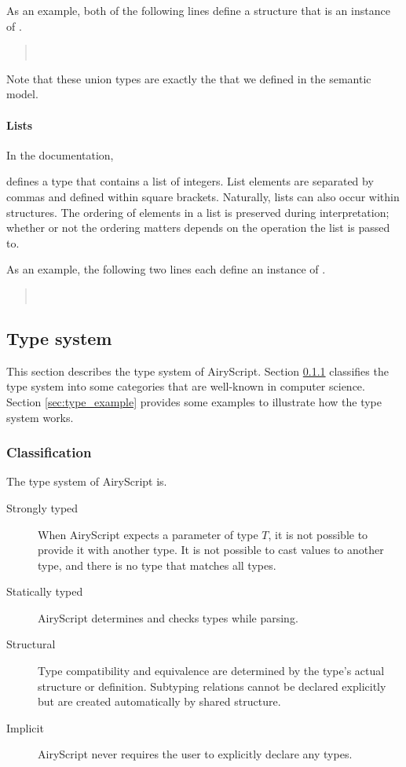 As an example, both of the following lines define a structure that is an
instance of .
\begin{quote}
  \\
\end{quote}

Note that these union types are exactly the  that we
defined in the semantic model.


\paragraph{Lists}
In the documentation,
\begin{quote}
  \tye{ = [Int]}
\end{quote}
defines a type that contains a list of integers. List elements are separated
by commas and defined within square brackets. Naturally, lists can also occur
within structures. The ordering of elements in a list is preserved during
interpretation; whether or not the ordering matters depends on the operation the
list is passed to.

As an example, the following two lines each define an instance of .
\begin{quote}
  \tye{[1,2,3,4]}\\
  \tye{[   5 , 2,1,2]}
\end{quote}


\subsection{Type system}
\label{sec:structural_type_system}
This section describes the type system of AiryScript. Section
\ref{sec:type_classification} classifies the type system into some categories
that are well-known in computer science. Section \ref{sec:type_example} provides
some examples to illustrate how the type system works.

\subsubsection{Classification}
\label{sec:type_classification}
The type system of AiryScript is.
\begin{description}
  \item[Strongly typed] When AiryScript expects a parameter of type $T$, it is
    not possible to provide it with another type. It is not possible to cast
    values to another type, and there is no type that matches all types.
  \item[Statically typed] AiryScript determines and checks types while parsing.
  \item[Structural] Type compatibility and equivalence are determined by the
    type’s actual structure or definition. Subtyping relations cannot be
    declared explicitly but are created automatically by shared structure.
  \item[Implicit] AiryScript never requires the user to explicitly declare any
    types.
\end{description}

